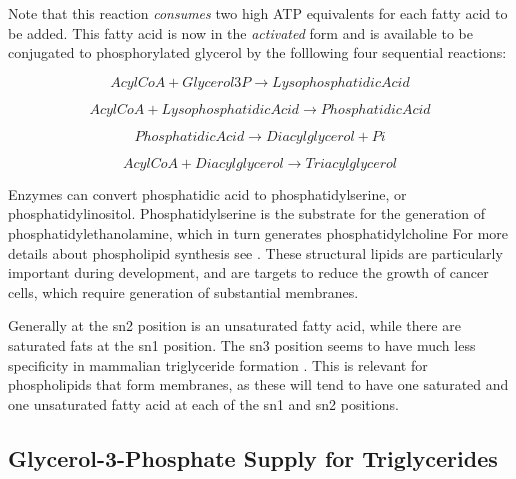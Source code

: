 \documentclass{tufte-handout}
\begin{document}
Note that this reaction \emph{consumes} two high ATP equivalents for each fatty acid to be added.  This fatty acid is now in the \emph{activated} form and is available to be conjugated to phosphorylated glycerol by the folllowing four sequential reactions:

\begin{equation}\label{eq:gpat}
AcylCoA + Glycerol3P \rightarrow Lysophosphatidic Acid
\end{equation}

\begin{equation}\label{eq:LPAT}
AcylCoA+ Lysophosphatidic Acid \rightarrow Phosphatidic Acid
\end{equation}

\begin{equation}\label{eq:lipin}
Phosphatidic Acid \rightarrow Diacylglycerol + Pi
\end{equation}

\begin{equation}
AcylCoA + Diacylglycerol \rightarrow Triacylglycerol
\end{equation}

  Enzymes can convert phosphatidic acid to phosphatidylserine, or phosphatidylinositol.  Phosphatidylserine is the substrate for the generation of phosphatidylethanolamine, which in turn generates phosphatidylcholine  For more details about phospholipid synthesis see \citet{Kent1995}.  These structural lipids are particularly important during development, and are targets to reduce the growth of cancer cells, which require generation of substantial membranes.  

  Generally at the sn2 position is an unsaturated fatty acid, while there are saturated fats at the sn1 position.  The sn3 position seems to have much less specificity in mammalian triglyceride formation \citep{Brockerhoff1971}.  This is relevant for phospholipids that form membranes, as these will tend to have one saturated and one unsaturated fatty acid at each of the sn1 and sn2 positions.  

\subsection{Glycerol-3-Phosphate Supply for Triglycerides}
\end{document}
